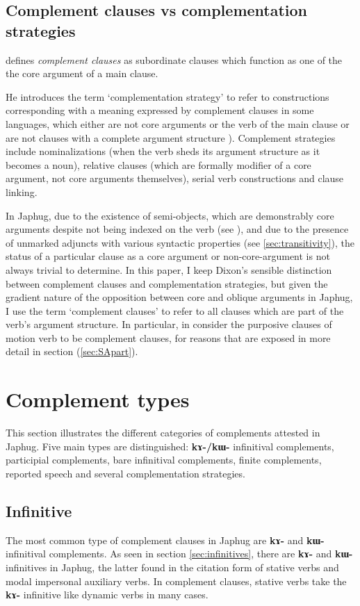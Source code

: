 \documentclass[oneside,a4paper,11pt]{article}
\newcommand{\ipa}[1]{\textbf{\phon#1}} %
\begin{document}
\subsection{Complement clauses vs complementation strategies} \label{sec:strategies}

\citet[15]{dixon06complementation} defines \textit{complement clauses} as subordinate clauses which function as one of the the core argument of a main clause. 

He introduces the term `complementation strategy' to refer to constructions corresponding with a meaning expressed by complement clauses in some languages, which either are not core arguments or the verb of the main clause or are not clauses with a complete argument structure \citealt[34-40]{dixon06complementation}). Complement strategies include nominalizations (when the verb sheds its argument structure as it becomes a noun), relative clauses (which are formally modifier of a core argument, not core arguments themselves), serial verb constructions and clause linking.

In Japhug, due to the existence of semi-objects, which are demonstrably core arguments despite not being indexed on the verb (see \citet{jacques16relatives}), and due to the presence of unmarked adjuncts with various syntactic properties (see \ref{sec:transitivity}), the status of a particular clause as a core argument or non-core-argument is not always trivial to determine. In this paper, I keep Dixon's sensible distinction between complement clauses and complementation strategies, but given the gradient nature of the opposition between core and oblique arguments in Japhug, I use the term `complement clauses' to refer to all clauses which are part of the verb's argument structure. In particular, in consider the purposive clauses of motion verb to be complement clauses, for reasons that are exposed in more detail in section (\ref{sec:SApart}).
 

\section{Complement types} \label{sec:complement.types}
This section illustrates the different categories of complements attested in Japhug. Five main types are distinguished: \ipa{kɤ-/kɯ-} infinitival complements, participial complements, bare infinitival complements, finite complements, reported speech and several complementation strategies.

\subsection{Infinitive} \label{sec:infinitives.compl}
The most common type of complement clauses in Japhug are \ipa{kɤ-} and \ipa{kɯ-} infinitival complements. As seen in section \ref{sec:infinitives}, there are \ipa{kɤ-} and \ipa{kɯ-} infinitives in Japhug, the latter found in the citation form of stative verbs and modal impersonal auxiliary verbs. In complement clauses, stative verbs take the \ipa{kɤ-} infinitive like dynamic verbs in many cases.
\end{document}
